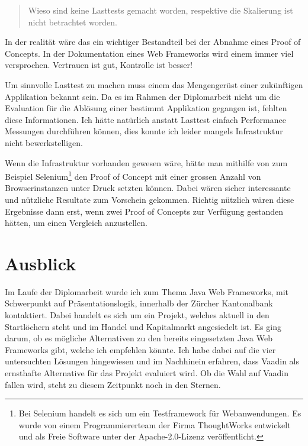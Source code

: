 \begin{quote}\begin{itshape}Wieso sind keine Lasttests gemacht worden,
respektive die Skalierung ist nicht betrachtet worden.\end{itshape}\end{quote}

In der realität wäre das ein wichtiger Bestandteil bei der Abnahme eines Proof
of Concepts. In der Dokumentation eines Web Frameworks wird einem immer viel
versprochen. Vertrauen ist gut, Kontrolle ist besser! 

Um sinnvolle Lasttest zu machen muss einem das Mengengerüst einer zukünftigen
Applikation bekannt sein. Da es im Rahmen der Diplomarbeit nicht um die
Evaluation für die Ablösung einer bestimmt Applikation gegangen ist, fehlten
diese Informationen. Ich hätte natürlich anstatt Lasttest einfach Performance
Messungen durchführen können, dies konnte ich leider mangels Infrastruktur nicht
bewerkstelligen.

Wenn die Infrastruktur vorhanden gewesen wäre, hätte man mithilfe von
zum Beispiel Selenium\footnote{Bei Selenium handelt es sich um ein
Testframework für Webanwendungen. Es wurde von einem Programmiererteam der
Firma ThoughtWorks entwickelt und als Freie Software unter der
Apache-2.0-Lizenz veröffentlicht.} den Proof of Concept mit einer grossen Anzahl
von Browserinstanzen unter Druck setzten können. Dabei wären sicher interessante
und nützliche Resultate zum Vorschein gekommen. Richtig nützlich wären diese
Ergebnisse dann erst, wenn zwei Proof of Concepts zur Verfügung gestanden
hätten, um einen Vergleich anzustellen.

\section{Ausblick}

Im Laufe der Diplomarbeit wurde ich zum Thema Java Web Frameworks, mit
Schwerpunkt auf Präsentationslogik, innerhalb der Zürcher Kantonalbank
kontaktiert. Dabei handelt es sich um ein Projekt, welches aktuell in den
Startlöchern steht und im Handel und Kapitalmarkt angesiedelt ist. Es ging
darum, ob es mögliche Alternativen zu den bereits eingesetzten Java Web
Frameworks gibt, welche ich empfehlen könnte. Ich habe dabei auf die vier
untersuchten Lösungen hingewiesen und im Nachhinein erfahren, dass Vaadin als
ernsthafte Alternative für das Projekt evaluiert wird. Ob die Wahl auf Vaadin
fallen wird, steht zu diesem Zeitpunkt noch in den Sternen.

